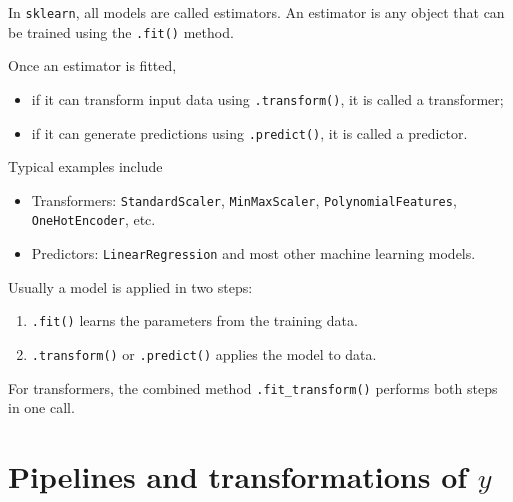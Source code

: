 \documentclass[
  letterpaper,
  DIV=11,
  numbers=noendperiod]{scrreprt}
\providecommand{\tightlist}{%
  \setlength{\itemsep}{0pt}\setlength{\parskip}{0pt}}
\theoremstyle{definition}
\theoremstyle{definition}
\theoremstyle{plain}
\theoremstyle{plain}
\theoremstyle{remark}
\begin{document}
\begin{tcolorbox}[enhanced jigsaw, arc=.35mm, bottomrule=.15mm, bottomtitle=1mm, breakable, colback=white, colbacktitle=quarto-callout-tip-color!10!white, colframe=quarto-callout-tip-color-frame, coltitle=black, left=2mm, leftrule=.75mm, opacityback=0, opacitybacktitle=0.6, rightrule=.15mm, title=\textcolor{quarto-callout-tip-color}{\faLightbulb}\hspace{0.5em}{Estimator, Predictor and Transformer}, titlerule=0mm, toprule=.15mm, toptitle=1mm]

In \texttt{sklearn}, all models are called estimators. An estimator is
any object that can be trained using the \texttt{.fit()} method.

Once an estimator is fitted,

\begin{itemize}
\tightlist
\item
  if it can transform input data using \texttt{.transform()}, it is
  called a transformer;
\item
  if it can generate predictions using \texttt{.predict()}, it is called
  a predictor.
\end{itemize}

Typical examples include

\begin{itemize}
\tightlist
\item
  Transformers: \texttt{StandardScaler}, \texttt{MinMaxScaler},
  \texttt{PolynomialFeatures}, \texttt{OneHotEncoder}, etc.
\item
  Predictors: \texttt{LinearRegression} and most other machine learning
  models.
\end{itemize}

Usually a model is applied in two steps:

\begin{enumerate}
\def\labelenumi{\arabic{enumi}.}
\tightlist
\item
  \texttt{.fit()} learns the parameters from the training data.
\item
  \texttt{.transform()} or \texttt{.predict()} applies the model to
  data.
\end{enumerate}

For transformers, the combined method \texttt{.fit\_transform()}
performs both steps in one call.

\end{tcolorbox}

\section{\texorpdfstring{Pipelines and transformations of
\(y\)}{Pipelines and transformations of y}}\label{pipelines-and-transformations-of-y}
\end{document}
